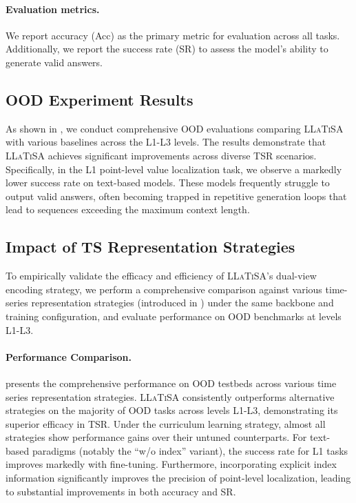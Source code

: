 \documentclass[11pt]{article}
\begin{document}
\paragraph{Evaluation metrics.} We report accuracy (Acc) as the primary metric for evaluation across all tasks. Additionally, we report the success rate (SR) to assess the model's ability to generate valid answers.

\subsection{OOD Experiment Results}
As shown in , we conduct comprehensive OOD evaluations comparing \textsc{LLaTiSA} with various baselines across the L1-L3 levels. The results demonstrate that \textsc{LLaTiSA} achieves significant improvements across diverse TSR scenarios. Specifically, in the L1 point-level value localization task, we observe a markedly lower success rate on text-based models. These models frequently struggle to output valid answers, often becoming trapped in repetitive generation loops that lead to sequences exceeding the maximum context length.

\subsection{Impact of TS Representation Strategies}
To empirically validate the efficacy and efficiency of \textsc{LLaTiSA}'s dual-view encoding strategy, we perform a comprehensive comparison against various time-series representation strategies (introduced in ) under the same backbone and training configuration, and evaluate performance on OOD benchmarks at levels L1-L3.
\paragraph{Performance Comparison.}
 presents the comprehensive performance on OOD testbeds across various time series representation strategies. 
\textsc{LLaTiSA} consistently outperforms alternative strategies on the majority of OOD tasks across levels L1-L3, demonstrating its superior efficacy in TSR.
Under the curriculum learning strategy, almost all strategies show performance gains over their untuned counterparts. For text-based paradigms (notably the ``w/o index'' variant), the success rate for L1 tasks improves markedly with fine-tuning. Furthermore, incorporating explicit index information significantly improves the precision of point-level localization, leading to substantial improvements in both accuracy and SR.
\end{document}
